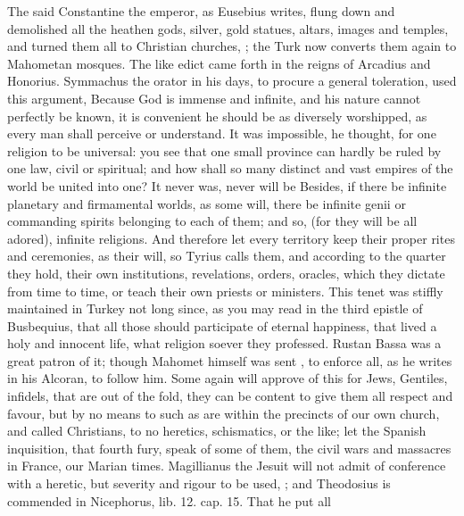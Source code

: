{The said Constantine the emperor, as Eusebius writes, flung down and
demolished all the heathen gods, silver, gold statues, altars, images
and temples, and turned them all to Christian churches, ; the Turk now converts them
again to Mahometan mosques. The like edict came forth in the reigns of
Arcadius and Honorius. Symmachus the orator in his days, to
procure a general toleration, used this argument, Because God is
immense and infinite, and his nature cannot perfectly be known, it is
convenient he should be as diversely worshipped, as every man shall
perceive or understand. It was impossible, he thought, for one religion
to be universal: you see that one small province can hardly be ruled by
one law, civil or spiritual; and how shall so many distinct and vast
empires of the world be united into one? It never was, never will be
Besides, if there be infinite planetary and firmamental worlds, as
some will, there be infinite genii or commanding spirits
belonging to each of them; and so,  (for they will be all
adored), infinite religions. And therefore let every territory keep
their proper rites and ceremonies, as their  will, so
Tyrius calls them, and according to the quarter they hold, their own
institutions, revelations, orders, oracles, which they dictate from
time to time, or teach their own priests or ministers. This tenet was
stiffly maintained in Turkey not long since, as you may read in the
third epistle of Busbequius, that all those should participate of
eternal happiness, that lived a holy and innocent life, what religion
soever they professed. Rustan Bassa was a great patron of it; though
Mahomet himself was sent , to enforce all, as he writes
in his Alcoran, to follow him. Some again will approve of this for
Jews, Gentiles, infidels, that are out of the fold, they can be content
to give them all respect and favour, but by no means to such as are
within the precincts of our own church, and called Christians, to no
heretics, schismatics, or the like; let the Spanish inquisition, that
fourth fury, speak of some of them, the civil wars and massacres in
France, our Marian times. Magillianus the Jesuit will not admit
of conference with a heretic, but severity and rigour to be used, ; and Theodosius is
commended in Nicephorus, \textlatin{lib. 12. cap. 15.} That he put all
}
